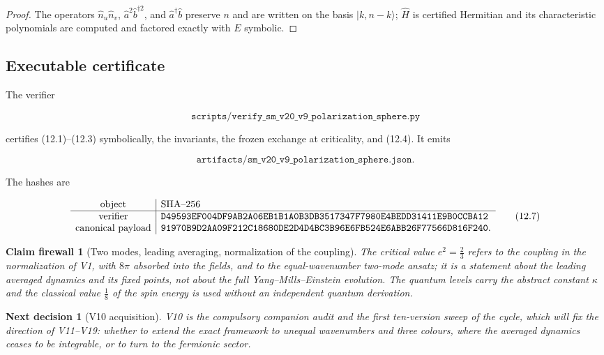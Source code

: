 \documentclass[11pt]{article}
\newtheorem{firewall}[theorem]{Claim firewall}
\newtheorem{decision}[theorem]{Next decision}
\theoremstyle{remark}
\begin{document}
\begin{proof}
The operators \(\hat n_u\hat n_v\), \(\hat a^2\hat b^{\dagger2}\), and
\(\hat a^\dagger\hat b\) preserve \(n\) and are written on the basis
\(|k,n-k\rangle\); \(\widehat H\) is certified Hermitian and its
characteristic polynomials are computed and factored exactly with
\(E\) symbolic.
\end{proof}

\subsection{Executable certificate}

The verifier

\[
 \texttt{scripts/verify\_sm\_v20\_v9\_polarization\_sphere.py}        \tag{12.5}
\]

certifies (12.1)--(12.3) symbolically, the invariants, the frozen
exchange at criticality, and (12.4).  It emits

\[
 \texttt{artifacts/sm\_v20\_v9\_polarization\_sphere.json}.           \tag{12.6}
\]

The hashes are

\[
\begin{array}{c|l}
\hbox{object}&\hbox{SHA--256}\\ \hline
\hbox{verifier}&
\texttt{D49593EF004DF9AB2A06EB1B1A0B3DB3517347F7980E4BEDD31411E9B0CCBA12}\\
\hbox{canonical payload}&
\texttt{91970B9D2AA09F212C18680DE2D4D4BC3B96E6FB524E6ABB26F77566D816F240}.
\end{array}                                                     \tag{12.7}
\]

\begin{firewall}[Two modes, leading averaging, normalization of the coupling]
\label{fire:v20v9}
The critical value \(e^2=\tfrac23\) refers to the coupling in the
normalization of V1, with \(8\pi\) absorbed into the fields, and to the
equal-wavenumber two-mode ansatz; it is a statement about the
leading averaged dynamics and its fixed points, not about the full
Yang--Mills--Einstein evolution.  The quantum levels carry the
abstract constant \(\kappa\) and the classical value \(\tfrac18\) of the
spin energy is used without an independent quantum derivation.
\end{firewall}

\begin{decision}[V10 acquisition]
\label{dec:v20v9-next}
V10 is the compulsory companion audit and the first ten-version
sweep of the cycle, which will fix the direction of V11--V19: whether
to extend the exact framework to unequal wavenumbers and three
colours, where the averaged dynamics ceases to be integrable, or to
turn to the fermionic sector.
\end{decision}
\end{document}

